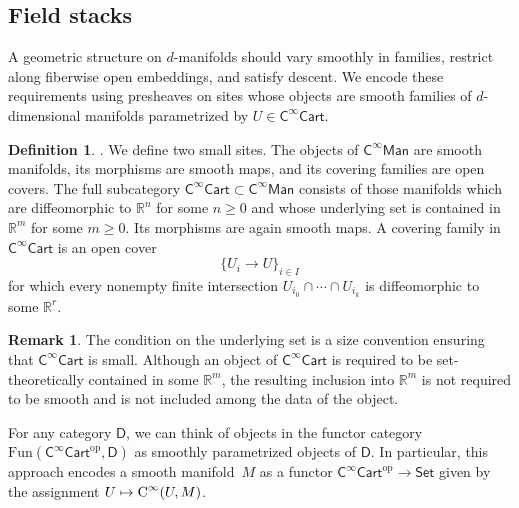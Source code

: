 \documentclass{amsart}
\newcommand{\cat}[1]{\mathsf{#1}}
\newcommand{\Set}{\cat{Set}}
\newcommand{\Cart}{\cat{C}^{\infty}\cat{Cart}}
\newcommand{\Man}{\cat{C}^{\infty}\cat{Man}}
\newcommand{\Fun}{\mathrm{Fun}}
\newcommand{\ra}{\rightarrow}
\newcommand{\RR}{{\mathbb{R}}}
\renewcommand{\op}{\mathrm{op}}
\theoremstyle{definition}
\newtheorem{definition}[equation]{Definition}
\newtheorem{remark}[equation]{Remark}
\numberwithin{equation}{subsection}
\numberwithin{subsubsection}{subsection}
\begin{document}
\subsection{Field stacks}

A geometric structure on \(d\)-manifolds should vary smoothly in families,
restrict along fiberwise open embeddings, and satisfy descent. We encode these
requirements using presheaves on sites whose objects are smooth families of
\(d\)-dimensional manifolds parametrized by \(U\in\Cart\).

\begin{definition}\label{def:Man.Cart.sites}
  \textnormal{\cite[Definition~2.1.8]{GP26}}.
  We define two small sites. The objects of \(\Man\) are smooth
  manifolds, its morphisms are smooth maps, and its covering families
  are open covers. The full subcategory
  \(\Cart\subset\Man\) consists of those manifolds which are
  diffeomorphic to \(\RR^n\) for some \(n\geq 0\) and whose underlying
  set is contained in \(\RR^m\) for some \(m\geq 0\). Its morphisms are
  again smooth maps. A covering family in \(\Cart\) is an open cover
  \[
    \{U_i\longrightarrow U\}_{i\in I}
  \]
  for which every nonempty finite intersection
  \(U_{i_0}\cap\cdots\cap U_{i_k}\) is diffeomorphic to some
  \(\RR^r\).
\end{definition}

\begin{remark}\label{rem:Cart.size.convention}
  The condition on the underlying set is a size convention ensuring
  that \(\Cart\) is small. Although an object of \(\Cart\) is required
  to be set-theoretically contained in some \(\RR^m\), the resulting
  inclusion into \(\RR^m\) is not required to be smooth and is not
  included among the data of the object.
\end{remark}

For any category \( \cat{D} \), we can think of objects in the
functor category \(
\Fun(\Cart^{\op}, \cat{D}) \) as smoothly parametrized objects of \(
\cat{D} \). In particular, this approach encodes a smooth manifold~\(M\) as a
functor \( \Cart^{\op} \ra \Set \) given by the assignment \(
U \mapsto \textnormal{C}^{\infty}(U, M) \).
\end{document}
